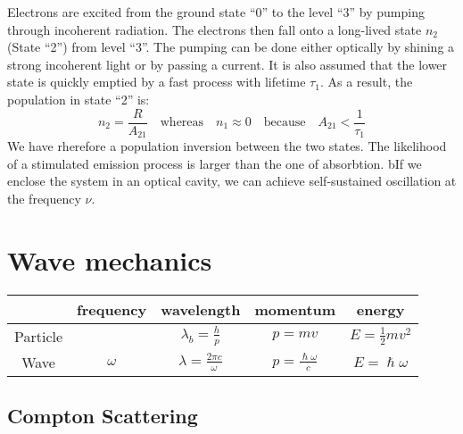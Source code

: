 \documentclass{article}
\begin{document}
\begin{twocolumn}
\begin{donotbrake}
Electrons are excited from the ground state ``0'' to the level ``3'' by pumping through incoherent radiation. 
The electrons then fall onto a long-lived state $n_2$ (State ``2'') from level ``3''. 
The pumping can be done either optically by shining a strong incoherent light or by passing a current. 
It is also assumed that the lower state is quickly emptied by a fast process with lifetime $\tau_1$. 
As a result, the population in state ``2'' is:
$$n_2 = \frac{R}{A_{21}} \quad \text{whereas} \quad n_1 \approx 0 \quad \text{because} \quad  A_{21} < \frac{1}{\tau_1}$$
We have rherefore a population inversion between the two states. 
The likelihood of a stimulated emission process is larger than the one of absorbtion. 
bIf we enclose the system in an optical cavity, we can achieve self-sustained oscillation at the frequency $\nu$.

\end{donotbrake}

\section{Wave mechanics}

\begin{center}
	\begin{tabular}{ccccc}
		& frequency & wavelength & momentum & energy \\
		\midrule
		Particle & & $\lambda_b = \frac{h}{p}$ & $p = m v$ & $E = \frac{1}{2} m v^2$ \\
		Wave & $\omega$ & $\lambda = \frac{2\pi c}{\omega}$ & $p = \frac{\hslash \omega}{c}$ & $E = \hslash \omega$ \\
	\end{tabular}
\end{center}

\begin{donotbrake}
\subsection{Compton Scattering}


\end{donotbrake}
\end{twocolumn}
\end{document}
